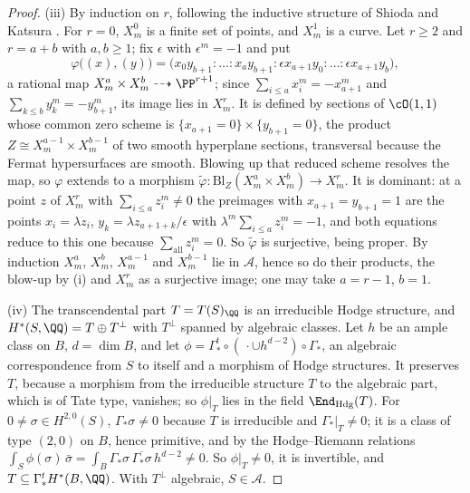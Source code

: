 \begin{proof}
(iii) By induction on $r$, following the inductive structure of Shioda and
Katsura \cite{SK79}. For $r=0$, $X^{0}_{m}$ is a finite set of points, and
$X^{1}_{m}$ is a curve. Let $r\ge2$ and $r=a+b$ with $a,b\ge1$; fix
$\epsilon$ with $\epsilon^{m}=-1$ and put
\[
  \varphi\bigl((x),(y)\bigr)=\bigl(x_{0}y_{b+1}:\dots:x_{a}y_{b+1}:
  \epsilon x_{a+1}y_{0}:\dots:\epsilon x_{a+1}y_{b}\bigr),
\]
a rational map $X^{a}_{m}\times X^{b}_{m}\dashrightarrow\PP^{r+1}$; since
$\sum_{i\le a}x_{i}^{m}=-x_{a+1}^{m}$ and $\sum_{k\le b}y_{k}^{m}=-y_{b+1}^{m}$,
its image lies in $X^{r}_{m}$. It is defined by sections of
$\cO(1,1)$ whose common zero scheme is $\{x_{a+1}=0\}\times\{y_{b+1}=0\}$,
the product $Z\cong X^{a-1}_{m}\times X^{b-1}_{m}$ of two smooth
hyperplane sections, transversal because the Fermat hypersurfaces
are smooth. Blowing up that reduced scheme resolves the map, so $\varphi$
extends to a morphism $\widetilde\varphi\colon\mathrm{Bl}_{Z}(X^{a}_{m}\times
X^{b}_{m})\to X^{r}_{m}$. It is dominant: at a point $z$ of $X^{r}_{m}$ with
$\sum_{i\le a}z_{i}^{m}\ne0$ the preimages with $x_{a+1}=y_{b+1}=1$ are the
points $x_{i}=\lambda z_{i}$, $y_{k}=\lambda z_{a+1+k}/\epsilon$ with
$\lambda^{m}\sum_{i\le a}z_{i}^{m}=-1$, and both equations reduce to this one
because $\sum_{\text{all}}z_{i}^{m}=0$. So $\widetilde\varphi$ is surjective,
being proper. By induction $X^{a}_{m}$, $X^{b}_{m}$, $X^{a-1}_{m}$ and
$X^{b-1}_{m}$ lie in $\mathcal{A}$, hence so do their products, the blow-up
by (i) and $X^{r}_{m}$ as a surjective image; one may take $a=r-1$, $b=1$.

(iv) The transcendental part $T=T(S)_{\QQ}$ is an irreducible Hodge
structure, and $H^{*}(S,\QQ)=T\oplus T^{\perp}$ with $T^{\perp}$ spanned by
algebraic classes. Let $h$ be an ample class on $B$, $d=\dim B$, and let
$\phi=\Gamma^{t}_{*}\circ(\,\cdot\cup h^{d-2})\circ\Gamma_{*}$, an algebraic
correspondence from $S$ to itself and a morphism of Hodge structures. It
preserves $T$, because a morphism from the irreducible structure $T$ to the
algebraic part, which is of Tate type, vanishes; so $\phi|_{T}$ lies in the
field $\End_{\mathrm{Hdg}}(T)$. For $0\ne\sigma\in H^{2,0}(S)$,
$\Gamma_{*}\sigma\ne0$ because $T$ is irreducible and $\Gamma_{*}|_{T}\ne0$;
it is a class of type $(2,0)$ on $B$, hence primitive, and by the
Hodge--Riemann relations $\int_{S}\phi(\sigma)\,\bar\sigma=\int_{B}
\Gamma_{*}\sigma\,\overline{\Gamma_{*}\sigma}\,h^{d-2}\ne0$. So
$\phi|_{T}\ne0$, it is invertible, and $T\subseteq\Gamma^{t}_{*}H^{*}(B,\QQ)$.
With $T^{\perp}$ algebraic, $S\in\mathcal{A}$.


\end{proof}
